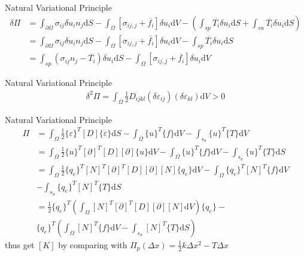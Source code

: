 \documentclass[11pt]{beamer}
\begin{document}
\begin{frame}{Natural Variational Principle}
\begin{align}    
\delta \Pi &= \int_{\partial \Omega}\sigma_{ij}\delta u_i n_j \mathrm{d}S - \int_{\Omega}[\sigma_{ij,j}+\overline{f_i}]\delta u_i \mathrm{d}V - (\int_{sp}\overline{T_i}\delta u_i\mathrm{d}S+\int_{su}\overline{T_i}\delta u_i\mathrm{d}S)\\
&=\int_{\partial \Omega}\sigma_{ij}\delta u_i n_j \mathrm{d}S - \int_{\Omega}[\sigma_{ij,j}+\overline{f_i}]\delta u_i \mathrm{d}V - \int_{sp}\overline{T_i}\delta u_i\mathrm{d}S\\
&=\int_{sp}(\sigma_{ij}n_j-\overline{T_i})\delta u_i  \mathrm{d}S - \int_{\Omega}[\sigma_{ij,j}+\overline{f_i}]\delta u_i \mathrm{d}V
\end{align}
\end{frame}

\begin{frame}{Natural Variational Principle}
\begin{align}    
\delta^2 \Pi = \int_{\Omega}\frac{1}{2}D_{ijkl}(\delta\varepsilon_{ij})(\delta\varepsilon_{kl})\mathrm{d}V>0
\end{align}
\end{frame}

%       

\begin{frame}{Natural Variational Principle}
\begin{align*}    
\Pi &= 
\int_{\Omega}\frac{1}{2}\{\varepsilon\}^T [D] \{\varepsilon\}\mathrm{d}S-
\int_{\Omega}\{u\}^T \{f\}\mathrm{d}V-\int_{s_\sigma} \{u\}^T \{T\}\mathrm{d}V\\
&= \int_{\Omega}\frac{1}{2}\{u\}^T[\partial]^T[D][\partial]\{u\}\mathrm{d}V-
\int_{\Omega}\{u\}^T \{f\}\mathrm{d}V-\int_{s_\sigma} \{u\}^T \{T\}\mathrm{d}S\\
&= \int_{\Omega}\frac{1}{2}\{q_e\}^T[N]^T[\partial]^T[D][\partial][N]\{q_e\}\mathrm{d}V-
\int_{\Omega}\{q_e\}^T[N]^T \{f\}\mathrm{d}V\\&-\int_{s_\sigma} \{q_e\}^T[N]^T \{T\}\mathrm{d}S\\
&= \frac{1}{2}\{q_e\}^T \left(\int_{\Omega} [N]^T[\partial]^T[D][\partial][N]\mathrm{d}V\right)\{q_e\}-\\&
\{q_e\}^T\left(\int_{\Omega}[N]^T \{f\}\mathrm{d}V-\int_{s_\sigma}[N]^T\{T\}\mathrm{d}S\right)
\end{align*}
thus get $[K]$ by comparing with $\Pi_p(\Delta x)= \frac{1}{2}k\Delta x^2-T\Delta x$
\end{frame}
\end{document}
